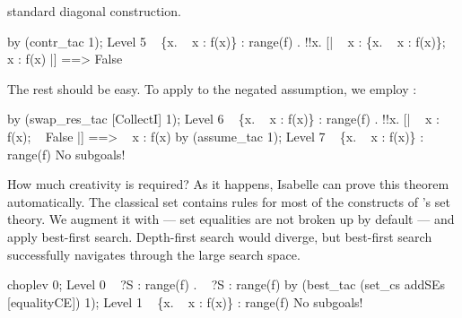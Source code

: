 standard diagonal construction.
\begin{ttbox}
by (contr_tac 1);
{\out Level 5}
{\out ~ \{x. ~ x : f(x)\} : range(f)}
{. !!x. [| ~ x : \{x. ~ x : f(x)\}; ~ x : f(x) |] ==> False}
\end{ttbox}
The rest should be easy.  To apply  to the negated
assumption, we employ :
\begin{ttbox}
by (swap_res_tac [CollectI] 1);
{\out Level 6}
{\out ~ \{x. ~ x : f(x)\} : range(f)}
{. !!x. [| ~ x : f(x); ~ False |] ==> ~ x : f(x)}
\ttbreak
by (assume_tac 1);
{\out Level 7}
{\out ~ \{x. ~ x : f(x)\} : range(f)}
{\out No subgoals!}
\end{ttbox}
How much creativity is required?  As it happens, Isabelle can prove this
theorem automatically.  The classical set  contains rules
for most of the constructs of {\HOL}'s set theory.  We augment it with
 --- set equalities are not broken up by default ---
and apply best-first search.  Depth-first search would diverge, but
best-first search successfully navigates through the large search space.
\begin{ttbox}
choplev 0;
{\out Level 0}
{\out ~ ?S : range(f)}
{. ~ ?S : range(f)}
\ttbreak
by (best_tac (set_cs addSEs [equalityCE]) 1);
{\out Level 1}
{\out ~ \{x. ~ x : f(x)\} : range(f)}
{\out No subgoals!}
\end{ttbox}
